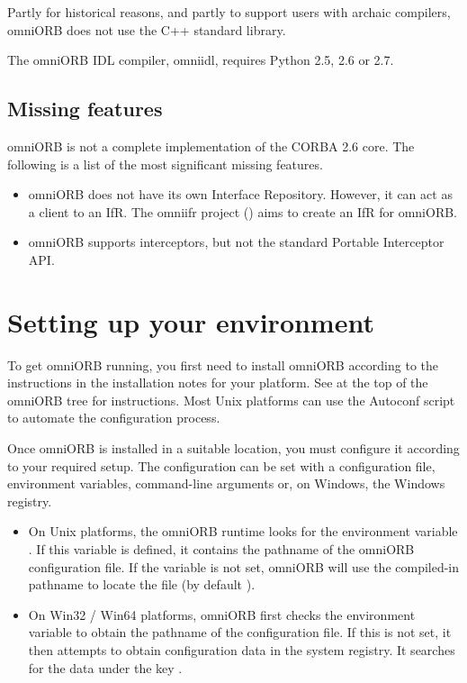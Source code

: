 \documentclass[11pt,oneside,a4paper]{book}
\begin{document}
Partly for historical reasons, and partly to support users with
archaic compilers, omniORB does not use the C++ standard library.

The omniORB IDL compiler, omniidl, requires Python 2.5, 2.6 or 2.7.


\subsection{Missing features}
\label{sec:missing}

omniORB is not a complete implementation of the CORBA 2.6 core.  The
following is a list of the most significant missing features.

\begin{itemize}

\item omniORB does not have its own Interface Repository. However, it
can act as a client to an IfR. The omniifr project
() aims to create an IfR for
omniORB.

\item omniORB supports interceptors, but not the standard Portable
Interceptor API.

\end{itemize}



\section{Setting up your environment}
\label{sec:setup}

To get omniORB running, you first need to install omniORB according to
the instructions in the installation notes for your platform. See
 at the top of the omniORB tree for
instructions. Most Unix platforms can use the Autoconf
 script to automate the configuration process.

Once omniORB is installed in a suitable location, you must configure
it according to your required setup. The configuration can be set with
a configuration file, environment variables, command-line arguments
or, on Windows, the Windows registry.

\begin{itemize}

\item On Unix platforms, the omniORB runtime looks for the environment
  variable . If this variable is defined, it
  contains the pathname of the omniORB configuration file. If the
  variable is not set, omniORB will use the compiled-in pathname to
  locate the file (by default ).

\item On Win32 / Win64 platforms, omniORB first checks the environment
  variable  to obtain the pathname of the
  configuration file. If this is not set, it then attempts to obtain
  configuration data in the system registry. It searches for the data
  under the key .

\end{itemize}
\end{document}
